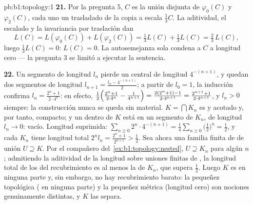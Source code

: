 \begin{solution}{pb:b1:topology:1}
\textbf{21.} Por la pregunta 5, $C$ es la unión disjunta de
$\varphi_0(C)$ y $\varphi_2(C)$, cada uno un trasladado de la copia
a escala $\frac13 C$. La aditividad, el escalado y la invariancia por
traslación dan
\[
L(C) = L(\varphi_0(C)) + L(\varphi_2(C))
= \tfrac13 L(C) + \tfrac13 L(C) = \tfrac23\,L(C),
\]
luego $\frac13 L(C) = 0$: $L(C) = 0$. La autosemejanza sola condena
a $C$ a longitud cero --- la pregunta 3 se limitó a ejecutar la
sentencia.

\textbf{22.} Un segmento de longitud $l_n$ pierde un 
central de longitud $4^{-(n+1)}$, y quedan dos segmentos de longitud
$l_{n+1} = \frac{l_n - 4^{-(n+1)}}{2}$; a partir de $l_0 = 1$, la
inducción confirma $l_n = \frac{2^n + 1}{2\cdot4^n}$: en efecto,
$\frac12\Bigl(\frac{2^n+1}{2\cdot4^n} - \frac{1}{4^{n+1}}\Bigr)
= \frac{2(2^n + 1) - 1}{2\cdot4^{n+1}} = \frac{2^{n+1} +
1}{2\cdot4^{n+1}}$, y $l_n > 0$ siempre: la construcción nunca se
queda sin material. $K = \bigcap K_n$ es  y acotado y, por
tanto, compacto; y un  dentro de $K$ está en un segmento de
$K_n$, de longitud $l_n \to 0$:  vacío. Longitud suprimida:
$\sum_{n\geq0} 2^n \cdot 4^{-(n+1)} =
\frac14\sum_{n\geq0}\bigl(\frac12\bigr)^n = \frac12$, y cada $K_n$
tiene longitud total $2^n l_n = \frac{2^n + 1}{2^{n+1}} > \frac12$.
Sea ahora una familia finita de   de unión
$U \supseteq K$. Por el  compañero
del~\cref{ex:b1:topology:nested}, $U \supseteq K_n$ para algún $n$;
admitiendo la aditividad de la longitud sobre uniones finitas de
, la longitud total de los  del recubrimiento es
al menos la de $K_n$, que supera $\frac12$. Luego $K$ es  en
ninguna parte y, sin embargo, no hay recubrimiento barato: la
pequeñez topológica ( en ninguna parte) y la pequeñez métrica
(longitud cero) son nociones genuinamente distintas, y $K$ las separa.


\end{solution}
